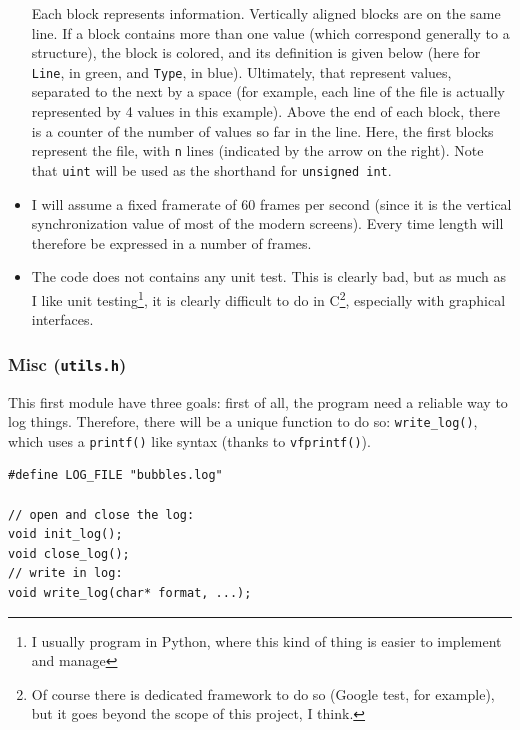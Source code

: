 \documentclass[12pt,a4paper]{article}
\newcommand{\cc}[1]{\texttt{#1}}
\begin{document}
\begin{itemize}
\begin{center}
\end{center}
Each block represents information. Vertically aligned blocks are on the same line. If a block contains more than one value (which correspond generally to a structure), the block is colored, and its definition is given below (here for \texttt{Line}, in green, and \texttt{Type}, in blue). Ultimately, that represent values, separated to the next by a space (for example, each line of the file is actually represented by 4 values in this example). Above the end of each block, there is a counter of the number of values so far in the line.
Here, the first blocks represent the file, with \texttt{n} lines (indicated by the arrow on the right). Note that \texttt{uint} will be used as the shorthand for \cc{unsigned int}.
\item I will assume  a fixed framerate of 60 frames per second (since it is the vertical synchronization value of most of the modern screens). Every time length will therefore be expressed in a number of frames. 
\item The code does not contains any unit test. This is clearly bad, but as much as I like unit testing\footnote{I usually program in Python, where this kind of thing is easier to implement and manage}, it is clearly difficult to do in C\footnote{Of course there is dedicated framework to do so (Google test, for example), but it goes beyond the scope of this project, I think.}, especially with graphical interfaces.
\end{itemize}

\subsubsection{Misc (\texttt{utils.h})}

This first module have three goals: first of all, the program need a reliable way to log things. Therefore, there will be a unique function to do so: \cc{write_log()}, which uses a \cc{printf()} like syntax (thanks to \cc{vfprintf()}).

\begin{verbatim}
#define LOG_FILE "bubbles.log"

// open and close the log:
void init_log();
void close_log();
// write in log:
void write_log(char* format, ...);
\end{verbatim}
\end{document}
